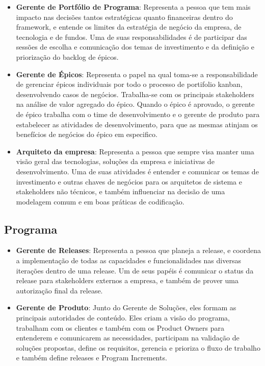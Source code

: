   \begin{itemize}
    \item \textbf{Gerente de Portfólio de Programa}: Representa a pessoa que tem mais impacto nas decisões tantos estratégicas quanto
      financeiras dentro do framework, e entende os limites da estratégia de negócio da empresa, de tecnologia e de fundos. Uma de suas
      responsabilidades é de participar das sessões de escolha e comunicação dos temas de investimento e da definição e priorização do
      backlog de épicos.
    \item \textbf{Gerente de Épicos}: Representa o papel na qual toma-se a responsabilidade de gerenciar épicos individuais por todo o
      processo de portifolio kanban, desenvolvendo casos de negócios. Trabalha-se com os principais stakeholders na análise de valor
      agregado do épico. Quando o épico é aprovado, o gerente de épico trabalha com o time de desenvolvimento e o gerente de produto
      para estabelecer as atividades de desenvolvimento, para que as mesmas atinjam os benefícios de negócios do épico em especifico.
    \item \textbf{Arquiteto da empresa}: Representa a pessoa que sempre visa manter uma visão geral das tecnologias, soluções da
      empresa e iniciativas de desenvolvimento. Uma de suas atividades é entender e comunicar os temas de investimento e outras chaves
      de negócios para os arquitetos de sistema e stakeholders não técnicos, e também influenciar na decisão de uma modelagem comum e
      em boas práticas de codificação.
  \end{itemize}

\subsection{\textbf{Programa}}

  \begin{itemize}
    \item \textbf{Gerente de Releases}: Representa a pessoa que planeja a release, e coordena a implementação de todas as capacidades e
      funcionalidades nas diversas iterações dentro de uma release. Um de seus papéis é comunicar o status da release para stakeholders
      externos a empresa, e também de prover uma autorização final da release.
    \item \textbf{Gerente de Produto}: Junto do Gerente de Soluções, eles formam as principais autoridades de conteúdo. Eles criam a
      visão do programa, trabalham com os clientes e também com os Product Owners para entenderem e comunicarem as necessidades,
      participam na validação de soluções propostas, define os requisitos, gerencia e prioriza o fluxo de trabalho e também define
      releases e Program Increments.
  \end{itemize}

